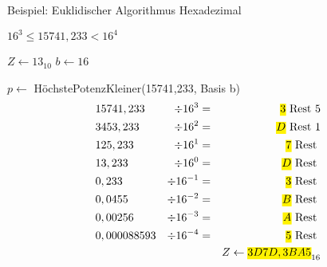 \documentclass[a4paper]{scrartcl}
\begin{document}
				 	\begin{algorithm}[H]
				 		\caption{Beispiel: Euklidischer Algorithmus Hexadezimal}
				 		\DontPrintSemicolon
				 		
				 	
				 	\( 16^3 \leq 15741,233 < 16^4 \)
				 	
				 	\( Z \gets 13_{10} \) 
				 	\( b \gets 16 \) \;
				 	\BlankLine
				 	
				 	\( p \gets \) HöchstePotenzKleiner(15741,233, Basis b) 
				 	\BlankLine
				 	\begin{align*}
				 	&15741,233 &\div 16^3 &= &\text{\hl{$ 3 $} Rest } 5 \\
				 	&3453,233 &\div 16^2 &= &\text{\hl{$ D $} Rest } 1 \\
				 	&125,233 &\div 16^1 &= &\text{\hl{$ 7 $} Rest }  \\
				 	&13,233 &\div 16^0 &= &\text{\hl{$ D $} Rest }  \\
				 	&0,233 &\div 16^{-1} &= &\text{\hl{$ 3 $} Rest }  \\
				 	&0,0455 &\div 16^{-2} &= &\text{\hl{$ B $} Rest }  \\
				 	&0,00256 &\div 16^{-3} &= &\text{\hl{$ A $} Rest }  \\
				 	&0,000088593 &\div 16^{-4} &= &\text{\hl{$ 5 $} Rest }  \\
				 	&&&&Z \gets \text{\hl{$ 3D7D,3BA5 $}}_{16} 
				 	\end{align*}
				 	\end{algorithm}
			 	
\end{document}
